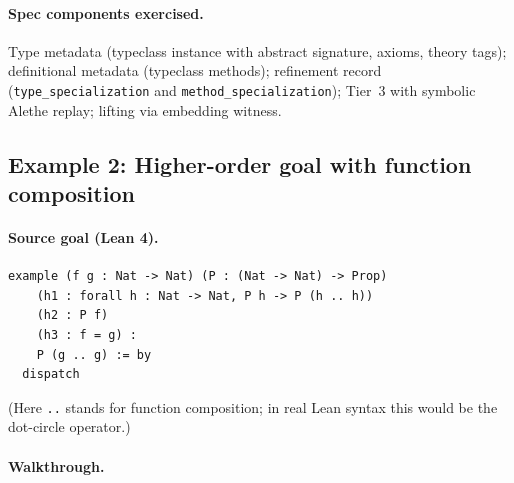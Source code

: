 \documentclass[11pt,letterpaper]{article}
\theoremstyle{definition}
\theoremstyle{remark}
\begin{document}
\paragraph{Spec components exercised.} Type metadata (typeclass instance
with abstract signature, axioms, theory tags); definitional metadata
(typeclass methods); refinement record (\texttt{type\_specialization} and
\texttt{method\_specialization}); Tier~3 with symbolic Alethe replay;
lifting via embedding witness.

\subsection{Example 2: Higher-order goal with function composition}
\label{sec:example2}

\paragraph{Source goal (Lean 4).}

\begin{lstlisting}[style=lean]
example (f g : Nat -> Nat) (P : (Nat -> Nat) -> Prop)
    (h1 : forall h : Nat -> Nat, P h -> P (h .. h))
    (h2 : P f)
    (h3 : f = g) :
    P (g .. g) := by
  dispatch
\end{lstlisting}

(Here \texttt{..} stands for function composition; in real Lean
syntax this would be the dot-circle operator.)

\paragraph{Walkthrough.}
\end{document}
